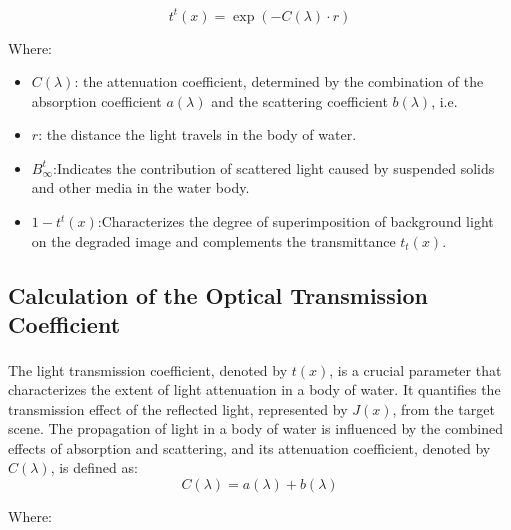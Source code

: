 \documentclass[withoutpreface,bwprint]{cumcmthesis}
\begin{document}
\[t^t(x) = \exp(-C(\lambda) \cdot r)\]

Where:

\begin{itemize}[itemindent=2em]
    \item $C(\lambda)$: the attenuation coefficient, determined by the combination of the absorption coefficient $a(\lambda)$ and the scattering coefficient $b(\lambda)$, i.e.

    \item $r$: the distance the light travels in the body of water.

    \item $B_{\infty}^{t}$:Indicates the contribution of scattered light caused by suspended solids and other media in the water body.

    \item $1 - t^t(x)$:Characterizes the degree of superimposition of background light on the degraded image and complements the transmittance $t_t(x)$.
    
\end{itemize}

\subsection{Calculation of the Optical Transmission Coefficient}

The light transmission coefficient\textsuperscript{\cite{kawaguchi1994relationship}}, denoted by $t(x)$, is a crucial parameter that characterizes the extent of light attenuation in a body of water. It quantifies the transmission effect of the reflected light, represented by $J(x)$, from the target scene. The propagation of light in a body of water is influenced by the combined effects of absorption and scattering, and its attenuation coefficient, denoted by $C(\lambda)$, is defined as:
\[C(\lambda) = a(\lambda) + b(\lambda)\]

Where:
\end{document}
